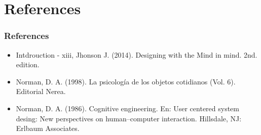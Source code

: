 \documentclass[11pt]{beamer}
\begin{document}
\section{References}
\begin{frame}
\frametitle{References}
\begin{itemize}
\item Intdrouction - xiii, Jhonson J. (2014). Designing with the Mind in mind. 2nd. edition.
\item Norman, D. A. (1998). La psicología de los objetos cotidianos (Vol. 6). Editorial Nerea.
\item Norman, D. A. (1986). Cognitive engineering. En: User centered system desing: New perspectives on human–computer interaction. Hillsdale, NJ: Erlbaum Associates.
\end{itemize}
\end{frame}
\end{document}
